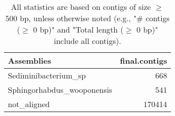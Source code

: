 \documentclass[12pt,a4paper]{article}
\begin{document}
\begin{table}[ht]
\begin{center}
\caption{All statistics are based on contigs of size $\geq$ 500 bp, unless otherwise noted (e.g., "\# contigs ($\geq$ 0 bp)" and "Total length ($\geq$ 0 bp)" include all contigs).}
\begin{tabular}{|l*{1}{|r}|}
\hline
Assemblies & final.contigs \\ \hline
Sediminibacterium\_sp & 668 \\ \hline
Sphingorhabdus\_wooponensis & 541 \\ \hline
not\_aligned & 170414 \\ \hline
\end{tabular}
\end{center}
\end{table}
\end{document}
